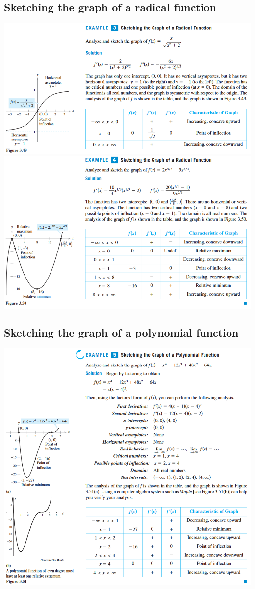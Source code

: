 \documentclass[11pt]{article}
\begin{document}
\subsection{Sketching the graph of a radical function}
\includegraphics{5.png} \newpage
\includegraphics{6.png}

\subsection{Sketching the graph of a polynomial function}
\includegraphics{7.png}

\subsection{}
\end{document}
